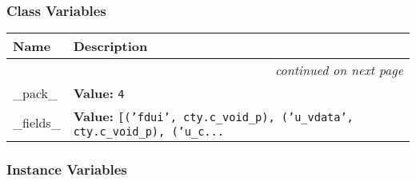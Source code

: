   \subsubsection{Class Variables}

    \vspace{-1cm}
\hspace{\varindent}\begin{longtable}{|p{\varnamewidth}|p{\vardescrwidth}|l}
\cline{1-2}
\cline{1-2} \centering \textbf{Name} & \centering \textbf{Description}& \\
\cline{1-2}
\endhead\cline{1-2}\multicolumn{3}{r}{\small\textit{continued on next page}}\\\endfoot\cline{1-2}
\endlastfoot\raggedright \_\-p\-a\-c\-k\-\_\- & \raggedright \textbf{Value:} 
{\tt 4}&\\
\cline{1-2}
\raggedright \_\-f\-i\-e\-l\-d\-s\-\_\- & \raggedright \textbf{Value:} 
{\tt [('fdui', cty.c\_void\_p), ('u\_vdata', cty.c\_void\_p), ('u\_c\texttt{...}}&\\
\cline{1-2}
\end{longtable}



  \subsubsection{Instance Variables}

